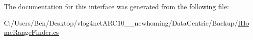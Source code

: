 The documentation for this interface was generated from the following file\-:\begin{DoxyCompactItemize}
\item 
C\-:/\-Users/\-Ben/\-Desktop/vlog4net\-A\-R\-C10\-\_\-\_\-newhoming/\-Data\-Centric/\-Backup/\hyperlink{_backup_2_i_home_range_finder_8cs}{I\-Home\-Range\-Finder.\-cs}\end{DoxyCompactItemize}
